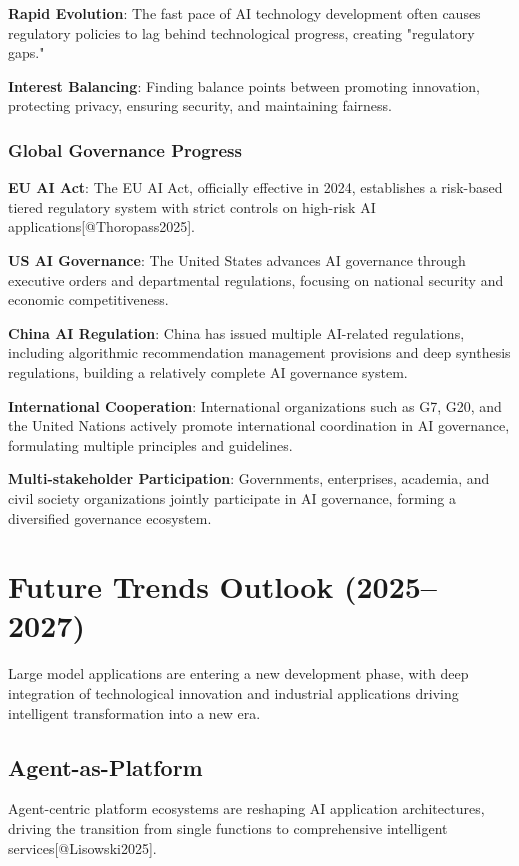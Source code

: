 \documentclass{article}
\begin{document}
\textbf{Rapid Evolution}: The fast pace of AI technology development often causes regulatory policies to lag behind technological progress, creating "regulatory gaps."

\textbf{Interest Balancing}: Finding balance points between promoting innovation, protecting privacy, ensuring security, and maintaining fairness.

\subsubsection{Global Governance Progress}
\textbf{EU AI Act}: The EU AI Act, officially effective in 2024, establishes a risk-based tiered regulatory system with strict controls on high-risk AI applications[@Thoropass2025].

\textbf{US AI Governance}: The United States advances AI governance through executive orders and departmental regulations, focusing on national security and economic competitiveness.

\textbf{China AI Regulation}: China has issued multiple AI-related regulations, including algorithmic recommendation management provisions and deep synthesis regulations, building a relatively complete AI governance system.

\textbf{International Cooperation}: International organizations such as G7, G20, and the United Nations actively promote international coordination in AI governance, formulating multiple principles and guidelines.

\textbf{Multi-stakeholder Participation}: Governments, enterprises, academia, and civil society organizations jointly participate in AI governance, forming a diversified governance ecosystem.

\section{Future Trends Outlook (2025–2027)}
Large model applications are entering a new development phase, with deep integration of technological innovation and industrial applications driving intelligent transformation into a new era.

\subsection{Agent-as-Platform}
Agent-centric platform ecosystems are reshaping AI application architectures, driving the transition from single functions to comprehensive intelligent services[@Lisowski2025].
\end{document}
